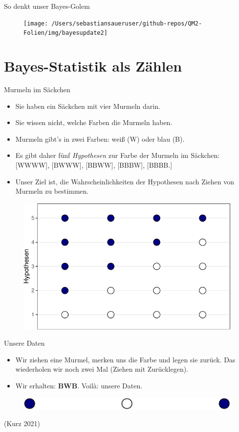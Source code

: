 \documentclass[
  ngerman,
  ignorenonframetext,
]{beamer}
\begin{document}
\begin{frame}{So denkt unser Bayes-Golem}
\protect\hypertarget{so-denkt-unser-bayes-golem}{}
\begin{figure}[H]
\texttt{[image: /Users/sebastiansaueruser/github-repos/QM2-Folien/img/bayesupdate2]} \end{figure}
\end{frame}

\hypertarget{bayes-statistik-als-zuxe4hlen}{%
\section{Bayes-Statistik als
Zählen}\label{bayes-statistik-als-zuxe4hlen}}

\begin{frame}{Murmeln im Säckchen}
\protect\hypertarget{murmeln-im-suxe4ckchen}{}
\begin{itemize}
\item
  Sie haben ein Säckchen mit vier Murmeln darin.
\item
  Sie wissen nicht, welche Farben die Murmeln haben.
\item
  Murmeln gibt's in zwei Farben: weiß (W) oder blau (B).
\item
  Es gibt daher fünf \emph{Hypothesen} zur Farbe der Murmeln im
  Säckchen: {[}WWWW{]}, {[}BWWW{]}, {[}BBWW{]}, {[}BBBW{]}, {[}BBBB.{]}
\item
  Unser Ziel ist, die Wahrscheinlichkeiten der Hypothesen nach Ziehen
  von Murmeln zu bestimmen.
\end{itemize}

\begin{figure}[H]
\includegraphics[width=0.5\linewidth]{unnamed-chunk-6-1} \end{figure}
\end{frame}

\begin{frame}{Unsere Daten}
\protect\hypertarget{unsere-daten}{}
\begin{itemize}
\item
  Wir ziehen eine Murmel, merken uns die Farbe und legen sie zurück. Das
  wiederholen wir noch zwei Mal (Ziehen mit Zurücklegen).
\item
  Wir erhalten: \textbf{BWB}. Voilà: unsere Daten.
\end{itemize}

\begin{figure}[H]
\includegraphics[width=0.7\linewidth]{unnamed-chunk-7-1} \end{figure}

(Kurz 2021)
\end{frame}
\end{document}
